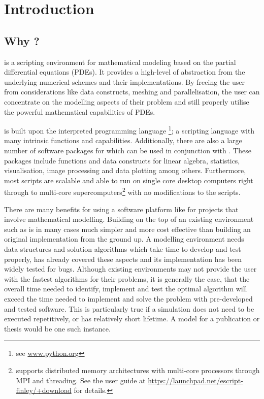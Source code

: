 
%
%
%

\chapter{Introduction}
\label{CHAP INTRO}
\section{Why \esc?}
\esc is a scripting environment for mathematical modeling based on the partial differential equations (PDEs). It provides a high-level of abstraction from the underlying numerical schemes and their implementations. By freeing the user from considerations like data constructs, meshing and parallelisation, the user can concentrate on the modelling aspects of their problem and still properly utilise the powerful mathematical capabilities of PDEs. 

\esc is built upon the interpreted programming language \pyt\footnote{see \url{www.python.org}}; a scripting language with many intrinsic functions and capabilities. Additionally, there are also a large number of software packages for \pyt which can be used in conjunction with \esc. These packages include functions and data constructs for linear algebra, statistics, visualisation, image processing and data plotting among others. Furthermore, most \esc scripts are scalable and able to run on single core desktop computers right through to multi-core supercomputers\footnote{\esc supports distributed memory architectures with multi-core processors through MPI and threading. See the \esc user guide at \url{https://launchpad.net/escript-finley/+download} for details.} with no modifications to the scripts. 

There are many benefits for using a software platform like \esc for projects that involve mathematical modelling. Building on the top of an existing environment such as \esc is in many cases much simpler and more cost effective than building an original implementation from the ground up. A modelling environment needs data structures and solution algorithms which take time to develop and test properly, \esc has already covered these aspects and its implementation has been widely tested for bugs. Although existing environments may not provide the user with the fastest algorithms for their problems, it is generally the case, that the overall time needed to identify, implement and test the optimal algorithm will exceed the time needed to implement and solve the problem with pre-developed and tested software. This is particularly true if a simulation does not need to be executed repetitively, or has relatively short lifetime. A model for a publication or thesis would be one such instance. 

